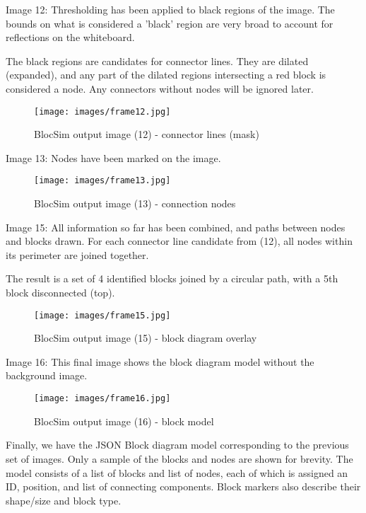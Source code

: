 \newpage
Image 12: Thresholding has been applied to black regions of the image. The bounds on what is considered a 'black' region are very broad to account for reflections on the whiteboard. 

The black regions are candidates for connector lines. They are dilated (expanded), and any part of the dilated regions intersecting a red block is considered a node. Any connectors without nodes will be ignored later.

\begin{figure}[ht!]
\centering
\texttt{[image: images/frame12.jpg]}
\caption{BlocSim output image (12) - connector lines (mask) \cite{blocsim}}
\label{im:frame12}
\end{figure}

\newpage
Image 13: Nodes have been marked on the image.

\begin{figure}[ht!]
\centering
\texttt{[image: images/frame13.jpg]}
\caption{BlocSim output image (13) - connection nodes \cite{blocsim}}
\label{im:frame13}
\end{figure}

\newpage
Image 15: All information so far has been combined, and paths between nodes and blocks drawn. For each connector line candidate from (12), all nodes within its perimeter are joined together. 

The result is a set of 4 identified blocks joined by a circular path, with a 5th block disconnected (top).

\begin{figure}[ht!]
\centering
\texttt{[image: images/frame15.jpg]}
\caption{BlocSim output image (15) - block diagram overlay \cite{blocsim}}
\label{im:frame15}
\end{figure}

\newpage
Image 16: This final image shows the block diagram model without the background image.

\begin{figure}[ht!]
\centering
\texttt{[image: images/frame16.jpg]}
\caption{BlocSim output image (16) - block model \cite{blocsim}}
\label{im:frame16}
\end{figure}

\clearpage
\newpage

Finally, we have the JSON Block diagram model corresponding to the previous set of images. Only a sample of the blocks and nodes are shown for brevity. The model consists of a list of blocks and list of nodes, each of which is assigned an ID, position, and list of connecting components. Block markers also describe their shape/size and block type.

